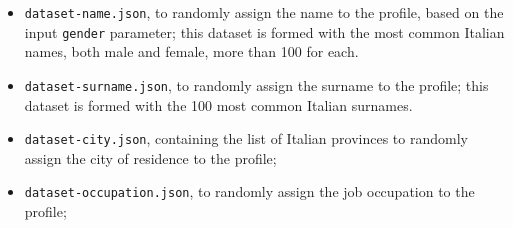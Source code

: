 \begin{itemize}
	\item \texttt{dataset-name.json}, to randomly assign the name to the profile, based on the input \texttt{gender} parameter; this dataset is formed with the most common Italian names, both male and female, more than 100 for each.
	\item \texttt{dataset-surname.json}, to randomly assign the surname to the profile; this dataset is formed with the 100 most common Italian surnames.
	\item \texttt{dataset-city.json}, containing the list of Italian provinces to randomly assign the city of residence to the profile;
	\item \texttt{dataset-occupation.json}, to randomly assign the job occupation to the profile;
\end{itemize} 

